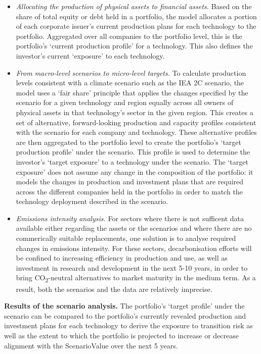 \documentclass[10pt,table,a4]{article}\usepackage[]{graphicx}\usepackage[]{color}
\begin{document}
\begin{multicols}{2}
\begin{itemize}
			\item{\textit{Allocating the production of physical assets to financial assets.} Based on the share of total equity or debt held in a portfolio, the model allocates a portion of each corporate issuer's current production plans for each technology to the portfolio. Aggregated over all companies to the portfolio level, this is the portfolio's `current production profile' for a technology. This also defines the investor's current `exposure' to each technology.}
			
			\item{\textit{From macro-level scenarios to micro-level targets. }To calculate production levels consistent with a climate scenario such as the IEA 2\degree C scenario, the model uses a `fair share' principle that applies the changes specified by the scenario for a given technology and region equally across all owners of physical assets in that technology's sector in the given region. This creates a set of alternative, forward-looking production and capacity profiles consistent with the scenario for each company and technology. These alternative profiles are then aggregated to the portfolio level to create the portfolio's `target production profile' under the scenario. This profile is used to determine the investor's `target exposure' to a technology under the scenario. The `target exposure' does not assume any change in the composition of the portfolio: it models the changes in production and investment plans that are required across the different companies held in the portfolio in order to match the technology deployment described in the scenario.} 
			
			\item{\textit{Emissions intensity analysis.} For sectors where there is not sufficent data available either regarding the assets or the scenarios and where there are no commerically suitable replacements, one solution is to analyse required changes in emissions intensity. For these sectors, decarbonisation efforts will be confined to increasing efficiency in production and use, as well as investment in research and 	development in the next 5-10 years, in order to bring CO\textsubscript{2}-neutral alternatives to market maturity in the medium term. As a result, both the scenarios and the data are relatively imprecise.}
			
		\end{itemize}
		
		\textbf{Results of the scenario analysis.} The portfolio's `target profile' under the scenario can be compared to the portfolio's currently revealed production and investment plans for each technology to derive the exposure to transition risk as well as the extent to which the portfolio is projected to increase or decrease alignment with the ScenarioValue over the next 5 years. 
		\newline
		
	\end{multicols}
			
\end{document}
